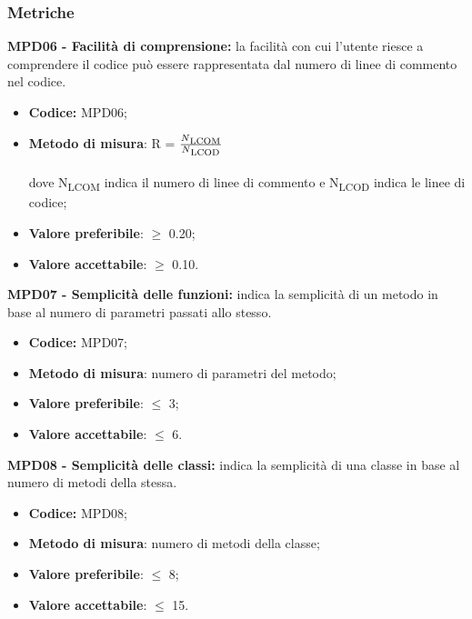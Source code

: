 \subsubsection{Metriche}
\textbf{MPD06 - Facilità di comprensione:} la facilità con cui l'utente riesce a comprendere il codice può essere rappresentata dal numero di linee di 
commento nel codice.
\begin{itemize}
    \item \textbf{Codice:} MPD06;
    \item \textbf{Metodo di misura}: R = $\frac{N\textsubscript{LCOM}}{N\textsubscript{LCOD}}$ \\
    \\dove N\textsubscript{LCOM} indica il numero di linee di commento e N\textsubscript{LCOD} indica le linee di codice;
    \item \textbf{Valore preferibile}: $\geq$ 0.20;
    \item \textbf{Valore accettabile}: $\geq$ 0.10.
\end{itemize}
\textbf{MPD07 - Semplicità delle funzioni:} indica la semplicità di un metodo in base al numero di parametri passati allo stesso.
\begin{itemize}
    \item \textbf{Codice:} MPD07;
    \item \textbf{Metodo di misura}: numero di parametri del metodo;
    \item \textbf{Valore preferibile}: $\leq$ 3;
    \item \textbf{Valore accettabile}: $\leq$ 6.
\end{itemize}
\textbf{MPD08 - Semplicità delle classi:} indica la semplicità di una classe in base al numero di metodi della stessa.
\begin{itemize}
    \item \textbf{Codice:} MPD08;
    \item \textbf{Metodo di misura}: numero di metodi della classe;
    \item \textbf{Valore preferibile}: $\leq$ 8;
    \item \textbf{Valore accettabile}: $\leq$ 15.
\end{itemize}

